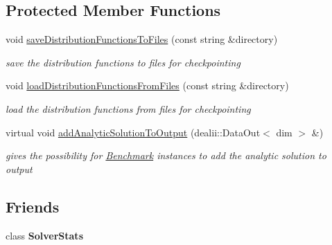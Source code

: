 \subsection*{Protected Member Functions}
\begin{DoxyCompactItemize}
\item 
\hypertarget{classnatrium_1_1CFDSolver_a9a2592ea549fa10427c84f0a1e380c1e}{
void \hyperlink{classnatrium_1_1CFDSolver_a9a2592ea549fa10427c84f0a1e380c1e}{saveDistributionFunctionsToFiles} (const string \&directory)}
\label{classnatrium_1_1CFDSolver_a9a2592ea549fa10427c84f0a1e380c1e}

\begin{DoxyCompactList}\small\item\em save the distribution functions to files for checkpointing \item\end{DoxyCompactList}\item 
\hypertarget{classnatrium_1_1CFDSolver_a42245d22e289d079a3b06a0c26f50050}{
void \hyperlink{classnatrium_1_1CFDSolver_a42245d22e289d079a3b06a0c26f50050}{loadDistributionFunctionsFromFiles} (const string \&directory)}
\label{classnatrium_1_1CFDSolver_a42245d22e289d079a3b06a0c26f50050}

\begin{DoxyCompactList}\small\item\em load the distribution functions from files for checkpointing \item\end{DoxyCompactList}\item 
\hypertarget{classnatrium_1_1CFDSolver_a9107b3f462bddc5b7988ec93f78797c2}{
virtual void \hyperlink{classnatrium_1_1CFDSolver_a9107b3f462bddc5b7988ec93f78797c2}{addAnalyticSolutionToOutput} (dealii::DataOut$<$ dim $>$ \&)}
\label{classnatrium_1_1CFDSolver_a9107b3f462bddc5b7988ec93f78797c2}

\begin{DoxyCompactList}\small\item\em gives the possibility for \hyperlink{classnatrium_1_1Benchmark}{Benchmark} instances to add the analytic solution to output \item\end{DoxyCompactList}\end{DoxyCompactItemize}
\subsection*{Friends}
\begin{DoxyCompactItemize}
\item 
\hypertarget{classnatrium_1_1CFDSolver_a077a2603e5a09310a68f71b538415f46}{
class {\bfseries SolverStats}}
\label{classnatrium_1_1CFDSolver_a077a2603e5a09310a68f71b538415f46}

\end{DoxyCompactItemize}


